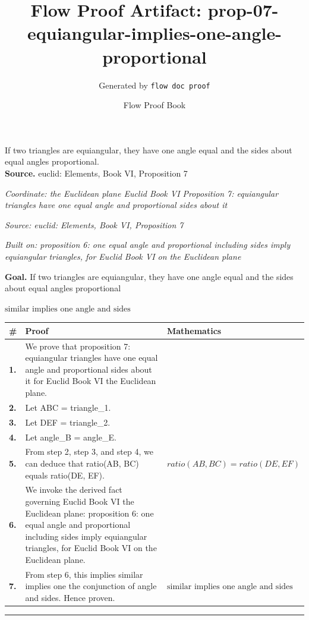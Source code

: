 \documentclass[11pt]{article}
\title{Flow Proof Artifact: prop-07-equiangular-implies-one-angle-proportional}
\author{Generated by \texttt{flow doc proof}}
\date{Flow Proof Book}
\theoremstyle{definition}
\begin{document}
\maketitle
If two triangles are equiangular, they have one angle equal and the sides about equal angles proportional.\\[0.5em]
\textbf{Source.} euclid: Elements, Book VI, Proposition 7\\[0.5em]
\bigskip
{}\par
\smallskip\noindent\textit{Coordinate: the Euclidean plane \cdot Euclid Book VI \cdot Proposition 7: equiangular triangles have one equal angle and proportional sides about it}\par
\smallskip\noindent\textit{Source: euclid: Elements, Book VI, Proposition 7}\par
\smallskip\noindent\textit{Built on: proposition 6: one equal angle and proportional including sides imply equiangular triangles, for Euclid Book VI on the Euclidean plane}\par
\medskip
\noindent\textbf{Goal.} If two triangles are equiangular, they have one angle equal and the sides about equal angles proportional\par
\noindent$\displaystyle \text{similar implies one angle and sides}$\par
\medskip
\noindent
\begin{tabular}{@{} >{\raggedright\arraybackslash}p{} >{\raggedright\arraybackslash}p{} >{\raggedleft\arraybackslash}p{} @{}}
\textbf{\#} & \textbf{Proof} & \textbf{Mathematics} \\
\midrule
\textbf{1.} & We prove that proposition 7: equiangular triangles have one equal angle and proportional sides about it for Euclid Book VI the Euclidean plane. & \\[0.45em]
\textbf{2.} & Let ABC = triangle\_1. & \\[0.45em]
\textbf{3.} & Let DEF = triangle\_2. & \\[0.45em]
\textbf{4.} & Let angle\_B = angle\_E. & \\[0.45em]
\textbf{5.} & From step 2, step 3, and step 4, we can deduce that ratio(AB, BC) equals ratio(DE, EF). & $\displaystyle ratio(AB, BC) = ratio(DE, EF)$ \\[0.45em]
\textbf{6.} & We invoke the derived fact governing Euclid Book VI the Euclidean plane: proposition 6: one equal angle and proportional including sides imply equiangular triangles, for Euclid Book VI on the Euclidean plane. & \\[0.45em]
\textbf{7.} & From step 6, this implies similar implies one the conjunction of angle and sides. Hence proven. & $\displaystyle \text{similar implies one angle and sides}$ \\[0.45em]
\bottomrule
\end{tabular}
\label{thm:Geometry-Euclid Book VI-proposition_7_equiangular_triangles_have_one_equal_angle_and_proportional_sides_about_it}
\par\medskip\hrule
\end{document}
